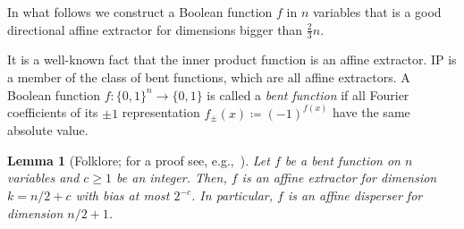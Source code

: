 \documentclass[a4paper,11pt,draft]{article}
\newtheorem{lemma}[theorem]{Lemma}
\theoremstyle{definition}
\theoremstyle{remark}
\DeclareMathOperator{\IP}{IP}
\renewcommand{\pmod}[1]{\ (\mathrm{mod}\ #1)}
\newcommand{\todo}[1]{\textbf{TODO:} #1}
\newcommand{\Q}{{\{0,1\}}}
\begin{document}
In what follows we construct a Boolean function $f$ in $n$ variables that is a good directional affine extractor for dimensions bigger than $\frac{2}{3}n$.



It is a well-known fact that the inner product function is an affine extractor. IP is a member of the class of bent functions, which are all affine extractors. A Boolean function $f\colon \Q^n \to \Q$ is called a \emph{bent function} if all Fourier coefficients of its $\pm 1$ representation $f_\pm(x) \coloneqq {(-1)}^{f(x)}$ have the same absolute value.

\begin{lemma}[Folklore; for a proof see, e.g.,~\cite{DBLP:conf/innovations/CohenS16,DBLP:journals/jcss/CheraghchiGJWX18}]
\label{lm:bent}
  Let $f$ be a bent function on $n$ variables and $c \ge 1$ be an integer. Then, $f$ is an affine extractor for dimension $k = n/2 + c$ with bias at most $2^{-c}$. In particular, $f$ is an affine disperser for dimension $n/2 + 1$.
\end{lemma}
\end{document}
